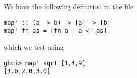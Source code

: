 
We have the following definition in the file 
\scriptsize\begin{verbatim}
map' :: (a -> b) -> [a] -> [b]
map' fn as = [fn a | a <- as]
\end{verbatim}\normalsize
which we test using
\scriptsize\begin{verbatim}
ghci> map' sqrt [1,4,9]
[1.0,2.0,3.0]
\end{verbatim}\normalsize
